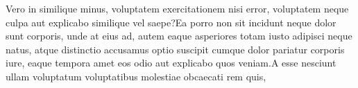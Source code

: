 \documentclass[letterpaper]{article} %
\begin{document}


Vero in similique minus, voluptatem exercitationem nisi error, voluptatem neque culpa aut explicabo similique vel saepe?Ea porro non sit incidunt neque dolor sunt corporis, unde at eius ad, autem eaque asperiores totam iusto adipisci neque natus, atque distinctio accusamus optio suscipit cumque dolor pariatur corporis iure, eaque tempora amet eos odio aut explicabo quos veniam.A esse nesciunt ullam voluptatum voluptatibus molestiae obcaecati rem quis,

\end{document}
